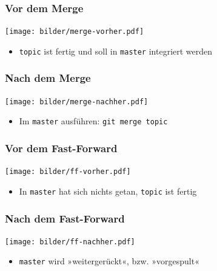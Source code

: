 \documentclass{beamer}
\begin{document}
\begin{frame}
\frametitle{Vor dem Merge}



\begin{center}
\texttt{[image: bilder/merge-vorher.pdf]}
\end{center}

\begin{itemize}
	\item \texttt{topic} ist fertig und soll in \texttt{master} integriert werden
\end{itemize}


\end{frame}
\begin{frame}
\frametitle{Nach dem Merge}



\begin{center}
\texttt{[image: bilder/merge-nachher.pdf]}
\end{center}

\begin{itemize}
	\item Im \texttt{master} ausführen: \texttt{git merge topic}
\end{itemize}


\end{frame}
\begin{frame}
\frametitle{Vor dem Fast-Forward}



\begin{center}
\texttt{[image: bilder/ff-vorher.pdf]}
\end{center}

\begin{itemize}
	\item In \texttt{master} hat sich nichts getan, \texttt{topic} ist fertig
\end{itemize}


\end{frame}
\begin{frame}
\frametitle{Nach dem Fast-Forward}



\begin{center}
\texttt{[image: bilder/ff-nachher.pdf]}
\end{center}

\begin{itemize}
	\item \texttt{master} wird »weitergerückt«, bzw. »vorgespult«
\end{itemize}


\end{frame}
\end{document}
